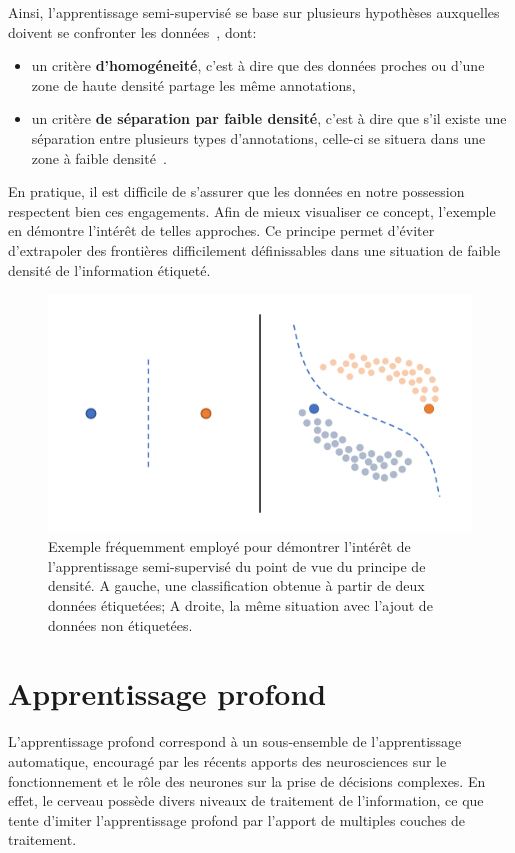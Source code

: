 Ainsi, l'apprentissage semi-supervisé se base sur plusieurs hypothèses auxquelles doivent se confronter les données~\cite{Zhu2009}, dont:
\begin{itemize}
	\item un critère \textbf{d'homogéneité}, c'est à dire que des données proches ou d'une zone de haute densité partage les même annotations, 
	\item un critère \textbf{de séparation par faible densité}, c'est à dire que s'il existe une  séparation entre plusieurs types d'annotations, celle-ci se situera dans une zone à faible densité~\cite{chapelle2005}.
\end{itemize}
En pratique, il est difficile de s'assurer que les données en notre possession respectent bien ces engagements. Afin de mieux visualiser ce concept, l'exemple en  démontre l'intérêt de telles approches. Ce principe permet d'éviter d'extrapoler des frontières difficilement définissables dans une situation de faible densité de l'information étiqueté.\par
 
\begin{figure}[H]
    \centering
    \includegraphics[width=\linewidth]{contents/chapter_3/resources/example_semi_supervised.pdf}
    \caption{Exemple fréquemment employé pour démontrer l'intérêt de l'apprentissage semi-supervisé du point de vue du principe de densité. A gauche, une classification obtenue à partir de deux données étiquetées; A droite, la même situation avec l’ajout de données non étiquetées.}
    \label{fig:example_semi_supervised}
\end{figure}

\clearpage

\section{Apprentissage profond}
L’apprentissage profond correspond à un sous-ensemble de l’apprentissage automatique, encouragé par les récents apports des neurosciences sur le fonctionnement et le rôle des neurones sur la prise de décisions complexes. En effet, le cerveau possède divers niveaux de traitement de l’information, ce que tente d'imiter l'apprentissage profond par l'apport de multiples couches de traitement.\par

